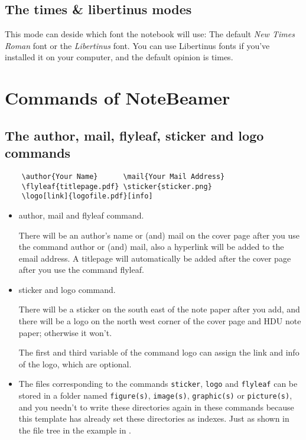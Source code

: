 \documentclass[11pt]{article}
\makeatletter
\def\@pkg#1{\texorpdfstring{\href{https://www.ctan.org/pkg/#1}%
{\textcolor{pkgcolor}{\textsf{#1}}}}{“#1”}}
\def\s@pkg#1{\texorpdfstring{\textcolor{pkgcolor}{\textsf{#1}}}{“#1”}}
\DeclareRobustCommand\pkg{\@ifstar\s@pkg\@pkg}
\def\mode#1{\texorpdfstring{\textcolor{moducolor}{\textsf{#1}}}{“#1”}}
\def\cmd#1{\texorpdfstring{\textcolor{cmdcolor}{\textsf{#1}}}{“#1”}}
\makeatother
\begin{document}
\subsection{The \mode{times} \& \mode{libertinus} modes}
This mode can deside which font the notebook will use: The default \emph{New Times Roman} font or the \emph{Libertinus} font. You can use Libertinus fonts if you've installed it on your computer, and the default opinion is \mode{times}.

\section{Commands of \pkg{NoteBeamer}}

\subsection{The \cmd{author}, \cmd{mail}, \cmd{flyleaf}, \cmd{sticker} and \cmd{logo} commands}
\begin{verbatim}
    \author{Your Name}      \mail{Your Mail Address}
    \flyleaf{titlepage.pdf} \sticker{sticker.png}
    \logo[link]{logofile.pdf}[info]
\end{verbatim}
\begin{itemize}
    \item \cmd{author}, \cmd{mail} and \cmd{flyleaf} command.
    
    There will be an author's name or (and) mail on the cover page after you use the command \cmd{author} or (and) \cmd{mail}, also a hyperlink will be added to the email address. A titlepage will automatically be added after the cover page after you use the command \cmd{flyleaf}.

    \item  \cmd{sticker} and \cmd{logo} command.
    
    There will be a sticker on the south east of the note paper after you add, and there will be a logo on the north west corner of the cover page and HDU note paper; otherwise it won't.

    The first and third variable of the command \cmd{logo} can assign the link and info of the logo, which are optional.

    \item The files corresponding to the commands \verb|sticker|, \verb|logo| and \verb|flyleaf| can be stored in a folder named \verb|figure(s)|, \verb|image(s)|, \verb|graphic(s)| or \verb|picture(s)|, and you needn't to write these directories again in these commands because this template has already set these directories as indexes. Just as shown in the file tree in the example in .
\end{itemize}
\end{document}

